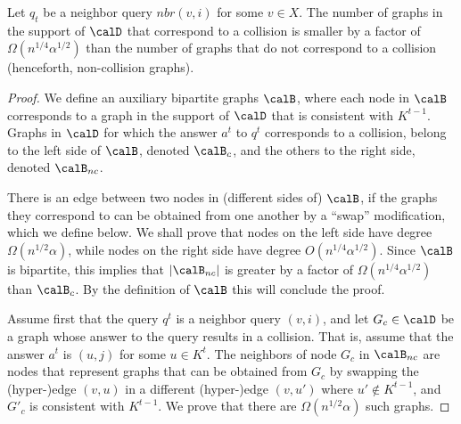 \iffalse
\begin{claim}
    Let $q_t$ be a neighbor query $nbr(v,i)$ for some $v\in X$. 
    The number of graphs in the support of $\calD$ that correspond to a collision is smaller by a factor of $\Omega(n^{1/4}\alpha^{1/2})$ than the number of graphs that do not correspond to a collision (henceforth, non-collision graphs).
\end{claim}
\begin{proof}
    We define an  auxiliary bipartite  graphs $\calB$, where each node in $\calB$ corresponds to a graph in the support of $\calD$ that is consistent with $K^{t-1}$.
   Graphs in $\calD$ for which the answer $a^t$ to $q^t$ corresponds to a collision, belong to the left side of $\calB$, denoted $\calB_{c}$, and the others to the right side, denoted $\calB_{nc}$.
    
    
    There is an edge between two nodes in (different sides of) $\calB$, if the graphs they correspond to can be obtained from one another by a ``swap'' modification, which we define below. 
    We shall prove that nodes  on the left side have degree $\Omega(n^{1/2}\alpha)$, while nodes on the right side have degree $O(n^{1/4}\alpha^{1/2})$. Since $\calB$ is bipartite, this implies that $|\calB_{nc}|$ is greater by a factor of $\Omega(n^{1/4}\alpha^{1/2})$ than $\calB_{c}$. By the definition of $\calB$ this will conclude the proof.
    
    Assume first that the query $q^t$ is a neighbor query $(v,i)$, and let $G_{c} \in \calD$ be a graph whose answer to the query results in a collision. That is, assume that the answer $a^t$ is $(u,j)$ for some $u\in K^t$. The neighbors of node $G_{c}$ in $\calB_{nc}$ are nodes that represent graphs that can be obtained from $G_{c}$ by swapping the (hyper-)edge $(v,u)$ in a different (hyper-)edge $(v, u')$ where $u'\notin K^{t-1}$, and  $G'_{c}$ is consistent with $K^{t-1}$. We prove that there are $\Omega(n^{1/2}\alpha)$ such graphs. 
    

\end{proof}
